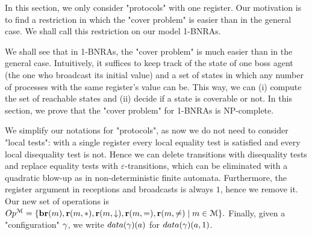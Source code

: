 	In this section, we only consider "protocols" with one register. Our motivation is to find a restriction in which the "cover problem" is easier than in the general case. We shall call this restriction on our model 1-BNRAs.

	We shall see that in 1-BNRAs, the "cover problem" is much easier than in the general case. Intuitively, it suffices to keep track of the state of one boss agent (the one who broadcast its initial value) and a set of states in which any number of processes with the same register's value can be. This way, we can (i) compute the set of reachable states and (ii) decide if a state is coverable or not. In this section, we prove that the "cover problem" for 1-BNRAs is NP-complete.

	We simplify our notations for "protocols", as now we do not need to consider "local tests": with a single register every local equality test is satisfied and every local disequality test is not.
	Hence we can delete transitions with disequality tests and replace equality tests with $\varepsilon$-transitions, which can be eliminated with a quadratic blow-up as in non-deterministic finite automata.
	Furthermore, the register argument in receptions and broadcasts is always $1$, hence we remove it.
	Our new set of operations is 
	$
	Op^{\mathcal{M}} = \{\textbf{br}(m), \textbf{r}(m, {*}), \textbf{r}(m, \downarrow), \textbf{r}(m, {=}), \textbf{r}(m, {\ne}) \mid m \in \mathcal{M}\}.
	$
	Finally, given a "configuration" $\gamma$, we write $\data{\config}(a)$ for $\data{\config}(a,1)$. 

		



